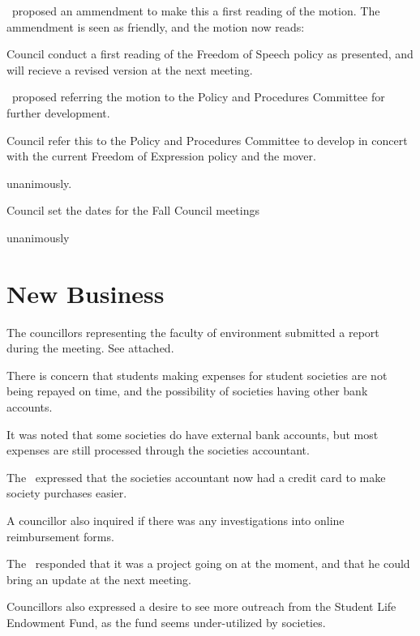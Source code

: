 \begin{motion}
    \tristan\ proposed an ammendment to make this a first reading of the motion. 
    The ammendment is seen as friendly, and the motion now reads:

    \birt Council conduct a first reading of the Freedom of Speech policy
    as presented, and will recieve a revised version at the next meeting. 

    \seneca\ proposed referring the motion to the Policy and Procedures
    Committee for further development. 

    \birt Council refer this to the Policy and Procedures Committee to develop
    in concert with the current Freedom of Expression policy and the mover. 
    \movers{\seneca}{\brian}

    \carries unanimously.
\end{motion}

\begin{motion}
    \birt Council set the dates for the Fall Council meetings
    \movers{\antonio}{\brian}

    \carries unanimously
\end{motion}


\section*{New Business}

\begin{information}

    The councillors representing the faculty of environment submitted a report 
    during the meeting. See attached. 

    There is concern that students making expenses for student societies are
    not being repayed on time, and the possibility of societies having other
    bank accounts. 

    It was noted that some societies do have external bank accounts, but 
    most expenses are still processed through the societies accountant. 

    The \vpof\ expressed that the societies accountant now had a credit card to
    make society purchases easier. 

    A councillor also inquired if there was any investigations into online
    reimbursement forms. 

    The \vpof\ responded that it was a project going on at the moment, and that
    he could bring an update at the next meeting. 

    Councillors also expressed a desire to see more outreach from the Student
    Life Endowment Fund, as the fund seems under-utilized by societies. 

\end{information}

